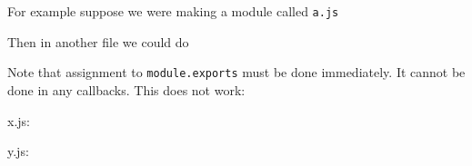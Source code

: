 For example suppose we were making a module called \texttt{a.js}

\begin{Shaded}
\begin{Highlighting}[]
 \NormalTok{(}\NormalTok{;}

 \NormalTok{= } \NormalTok{();}

\NormalTok{(}\NormalTok{() \{}
  \NormalTok{(}\NormalTok{);}
\NormalTok{\}, }\NormalTok{);}
\end{Highlighting}
\end{Shaded}

Then in another file we could do

\begin{Shaded}
\begin{Highlighting}[]
 \NormalTok{(}\NormalTok{);}
\NormalTok{(}\NormalTok{, }\NormalTok{() \{}
  \NormalTok{(}\NormalTok{);}
\NormalTok{\});}
\end{Highlighting}
\end{Shaded}

Note that assignment to \texttt{module.exports} must be done
immediately. It cannot be done in any callbacks. This does not work:

x.js:

\begin{Shaded}
\begin{Highlighting}[]
\NormalTok{(}\NormalTok{() \{}
   \NormalTok{= \{ }\NormalTok{: } \NormalTok{\};}
\NormalTok{\}, }\NormalTok{);}
\end{Highlighting}
\end{Shaded}

y.js:

\begin{Shaded}
\begin{Highlighting}[]
 \NormalTok{(}\NormalTok{);}
\NormalTok{(}\NormalTok{);}
\end{Highlighting}
\end{Shaded}

